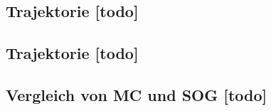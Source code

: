 \begin{comment}
--------------------------------------------------------------------------------
\end{comment}
\subsection{Trajektorie [todo]}


\begin{comment}
--------------------------------------------------------------------------------
\end{comment}
\subsection{Trajektorie [todo]}


\begin{comment}
--------------------------------------------------------------------------------
\end{comment}
\subsection{Vergleich von MC und SOG [todo]}

